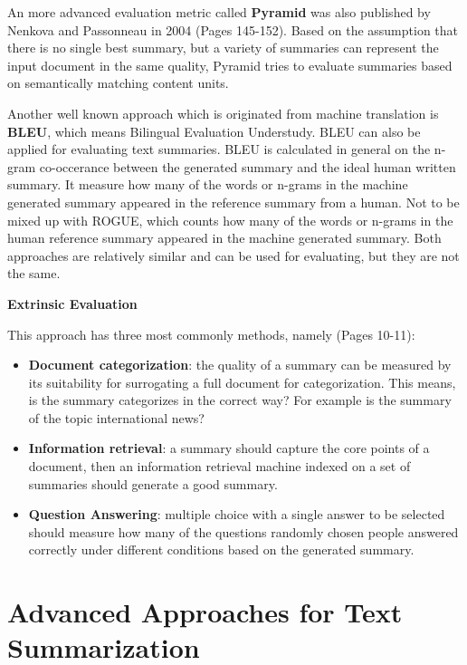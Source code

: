 An more advanced evaluation metric called \textbf{Pyramid} was also published by Nenkova and Passonneau in 2004 \cite{nenkova-passonneau-2004-evaluating} (Pages 145-152). Based on the assumption that there is no single best summary, but a variety of summaries can represent the input document in the same quality, Pyramid tries to evaluate summaries based on semantically matching content units. 

Another well known approach which is originated from machine translation is \textbf{BLEU}, which means Bilingual Evaluation Understudy. BLEU can also be applied for evaluating text summaries. BLEU is calculated in general on the n-gram co-occerance between the generated summary and the ideal human written summary. It measure how many of the words or n-grams in the machine generated summary appeared in the  reference summary from a human. Not to be mixed up with ROGUE, which counts how many of the words or n-grams in the human reference summary appeared in the machine generated summary. Both approaches are relatively similar and can be used for evaluating, but they are not the same.

\textbf{Extrinsic Evaluation}

This approach has three most commonly methods, namely \cite{journals/cai/SteinbergerJ09} (Pages 10-11):

\begin{itemize}
	\item \textbf{Document categorization}: the quality of a summary can be measured by its suitability for surrogating a full document for categorization. This means, is the summary categorizes in the correct way? For example is the summary of the topic international news? 
	\item \textbf{Information retrieval}: a summary should capture the core points of a document, then an information retrieval 
	machine indexed on a set of summaries should generate a good summary. 
	\item \textbf{Question Answering}: multiple choice with a single answer to be selected should measure how many of the questions randomly chosen people answered correctly under different conditions based on the generated summary.
\end{itemize}

\section{Advanced Approaches for Text Summarization}\label{ss:trends}

